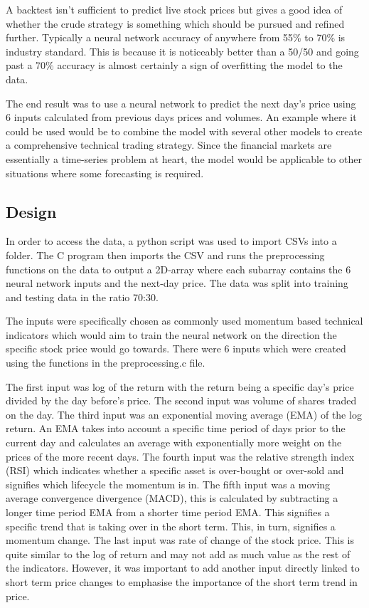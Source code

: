 \documentclass[11pt]{article}
\begin{document}
A backtest isn't sufficient to predict live stock prices but gives a good idea of whether the crude strategy is something which should be pursued and refined further. Typically a neural network accuracy of anywhere from 55\% to 70\% is industry standard. This is because it is noticeably better than a 50/50 and going past a 70\% accuracy is almost certainly a sign of overfitting the model to the data.

The end result was to use a neural network to predict the next day's price using 6 inputs calculated from previous days prices and volumes. An example where it could be used would be to combine the model with several other models to create a comprehensive technical trading strategy. Since the financial markets are essentially a time-series problem at heart, the model would be applicable to other situations where some forecasting is required.

\subsection{Design}
In order to access the data, a python script was used to import CSVs into a folder. The C program then imports the CSV and runs the preprocessing functions on the data to output a 2D-array where each subarray contains 
the 6 neural network inputs and the next-day price. The data was split into training and testing data in the ratio 70:30.

The inputs were specifically chosen as commonly used momentum based technical indicators which would aim to train the neural network on the direction the specific stock price would go towards. There were 6 inputs which were created using the functions in the preprocessing.c file. 

The first input was log of the return with the return being a specific day's price divided by the day before's price. The second input was volume of shares traded on the day. The third input was an exponential moving average (EMA) of the log return. An EMA takes into account a specific time period of days prior to the current day and calculates an average with exponentially more weight on the prices of the more recent days. The fourth input was the relative strength index (RSI) which indicates whether a specific asset is over-bought or over-sold and signifies which lifecycle the momentum is in. The fifth input was a moving average convergence divergence (MACD), this is calculated by subtracting a longer time period EMA from a shorter time period EMA. This signifies a specific trend that is taking over in the short term. This, in turn, signifies a momentum change. The last input was rate of change of the stock price. This is quite similar to the log of return and may not add as much value as the rest of the indicators. However, it was important to add another input directly linked to short term price changes to emphasise the importance of the short term trend in price.
\end{document}
